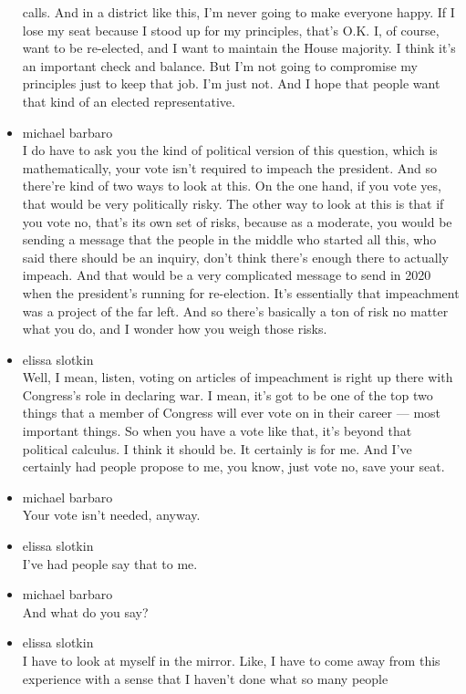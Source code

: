 \begin{itemize}
  calls. And in a district like this, I'm never going to make everyone
  happy. If I lose my seat because I stood up for my principles, that's
  O.K. I, of course, want to be re-elected, and I want to maintain the
  House majority. I think it's an important check and balance. But I'm
  not going to compromise my principles just to keep that job. I'm just
  not. And I hope that people want that kind of an elected
  representative.
\item
  michael barbaro\\
  I do have to ask you the kind of political version of this question,
  which is mathematically, your vote isn't required to impeach the
  president. And so there're kind of two ways to look at this. On the
  one hand, if you vote yes, that would be very politically risky. The
  other way to look at this is that if you vote no, that's its own set
  of risks, because as a moderate, you would be sending a message that
  the people in the middle who started all this, who said there should
  be an inquiry, don't think there's enough there to actually impeach.
  And that would be a very complicated message to send in 2020 when the
  president's running for re-election. It's essentially that impeachment
  was a project of the far left. And so there's basically a ton of risk
  no matter what you do, and I wonder how you weigh those risks.
\item
  elissa slotkin\\
  Well, I mean, listen, voting on articles of impeachment is right up
  there with Congress's role in declaring war. I mean, it's got to be
  one of the top two things that a member of Congress will ever vote on
  in their career --- most important things. So when you have a vote
  like that, it's beyond that political calculus. I think it should be.
  It certainly is for me. And I've certainly had people propose to me,
  you know, just vote no, save your seat.
\item
  michael barbaro\\
  Your vote isn't needed, anyway.
\item
  elissa slotkin\\
  I've had people say that to me.
\item
  michael barbaro\\
  And what do you say?
\item
  elissa slotkin\\
  I have to look at myself in the mirror. Like, I have to come away from
  this experience with a sense that I haven't done what so many people

\end{itemize}
